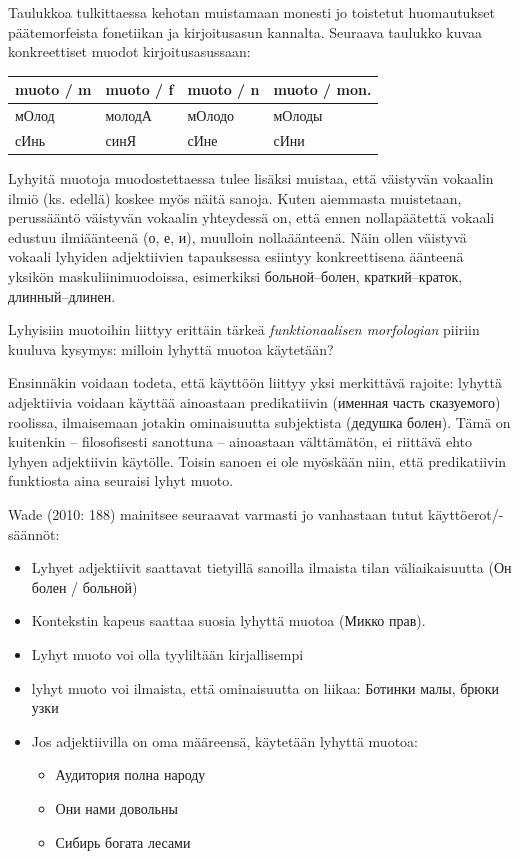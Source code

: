 \documentclass[]{scrartcl}
\providecommand{\tightlist}{%
  \setlength{\itemsep}{0pt}\setlength{\parskip}{0pt}}
\begin{document}
Taulukkoa tulkittaessa kehotan muistamaan monesti jo toistetut
huomautukset päätemorfeista fonetiikan ja kirjoitusasun kannalta.
Seuraava taulukko kuvaa konkreettiset muodot kirjoitusasussaan:

\begin{longtable}[c]{@{}llll@{}}
\toprule
muoto / m & muoto / f & muoto / n & muoto / mon.\tabularnewline
\midrule
\endhead
мОлод & молодА & мОлодо & мОлоды\tabularnewline
сИнь & синЯ & сИне & сИни\tabularnewline
\bottomrule
\end{longtable}

Lyhyitä muotoja muodostettaessa tulee lisäksi muistaa, että väistyvän
vokaalin ilmiö (ks. edellä) koskee myös näitä sanoja. Kuten aiemmasta
muistetaan, perussääntö väistyvän vokaalin yhteydessä on, että ennen
nollapäätettä vokaali edustuu ilmiäänteenä (о, е, и), muulloin
nollaäänteenä. Näin ollen väistyvä vokaali lyhyiden adjektiivien
tapauksessa esiintyy konkreettisena äänteenä yksikön
maskuliinimuodoissa, esimerkiksi больной--болен, краткий--краток,
длинный--длинен.

Lyhyisiin muotoihin liittyy erittäin tärkeä \emph{funktionaalisen
morfologian} piiriin kuuluva kysymys: milloin lyhyttä muotoa käytetään?

Ensinnäkin voidaan todeta, että käyttöön liittyy yksi merkittävä
rajoite: lyhyttä adjektiivia voidaan käyttää ainoastaan predikatiivin
(именная часть сказуемого) roolissa, ilmaisemaan jotakin ominaisuutta
subjektista (дедушка болен). Tämä on kuitenkin -- filosofisesti
sanottuna -- ainoastaan välttämätön, ei riittävä ehto lyhyen adjektiivin
käytölle. Toisin sanoen ei ole myöskään niin, että predikatiivin
funktiosta aina seuraisi lyhyt muoto.

Wade (2010: 188) mainitsee seuraavat varmasti jo vanhastaan tutut
käyttöerot/-säännöt:

\begin{itemize}
\tightlist
\item
  Lyhyet adjektiivit saattavat tietyillä sanoilla ilmaista tilan
  väliaikaisuutta (Он болен / больной)
\item
  Kontekstin kapeus saattaa suosia lyhyttä muotoa (Микко прав).
\item
  Lyhyt muoto voi olla tyyliltään kirjallisempi
\item
  lyhyt muoto voi ilmaista, että ominaisuutta on liikaa: Ботинки малы,
  брюки узки
\item
  Jos adjektiivilla on oma määreensä, käytetään lyhyttä muotoa:

  \begin{itemize}
  \tightlist
  \item
    Аудитория полна народу
  \item
    Они нами довольны
  \item
    Сибирь богата лесами
  \end{itemize}
\end{itemize}
\end{document}
